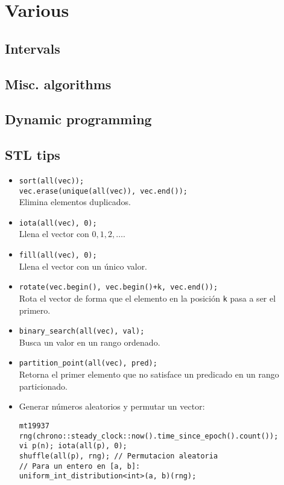 \chapter{Various}

\section{Intervals}

\section{Misc. algorithms}

\section{Dynamic programming}

\section{STL tips}
\begin{itemize}
    \item \verb|sort(all(vec));| \\ \verb|vec.erase(unique(all(vec)), vec.end());| \\
    Elimina elementos duplicados.
    \item \verb|iota(all(vec), 0);| \\
    Llena el vector con $0, 1, 2, \dots$.
    \item \verb|fill(all(vec), 0);| \\
    Llena el vector con un único valor.
    \item \lstinline|rotate(vec.begin(), vec.begin()+k, vec.end());| \\
    Rota el vector de forma que el elemento en la posición \texttt{k} pasa a ser el primero.
    \item \verb|binary_search(all(vec), val);| \\
    Busca un valor en un rango ordenado.
    \item \verb|partition_point(all(vec), pred);| \\
    Retorna el primer elemento que no satisface un predicado en un rango particionado.
    \item Generar números aleatorios y permutar un vector:
\begin{lstlisting}
mt19937 rng(chrono::steady_clock::now().time_since_epoch().count());
vi p(n); iota(all(p), 0);
shuffle(all(p), rng); // Permutacion aleatoria
// Para un entero en [a, b]:
uniform_int_distribution<int>(a, b)(rng);
\end{lstlisting}
\end{itemize}

